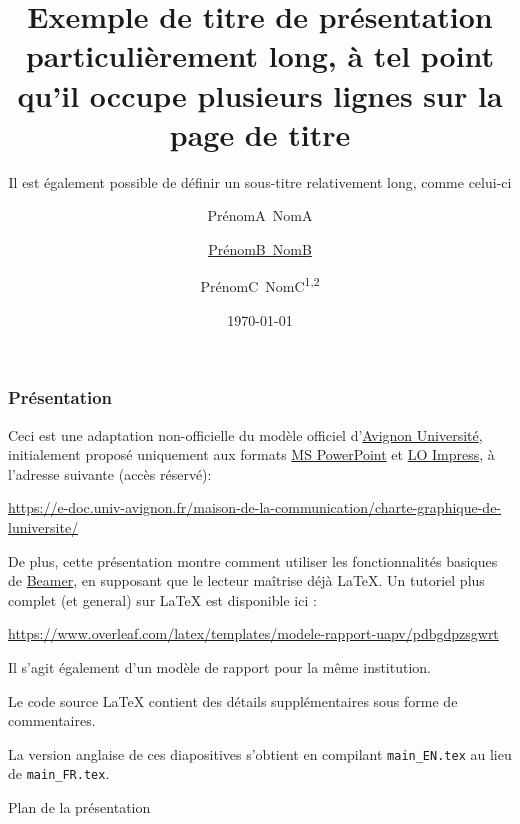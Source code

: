 \documentclass[10pt,    %
    french,             %
    xcolor=table,       %
    envcountsect,       %
    aspectratio=43      %
]{beamer}
\title[Titre court] %
    {Exemple de titre de présentation particulièrement long, à tel point qu'il occupe plusieurs lignes sur la page de titre}
\subtitle{Il est également possible de définir un sous-titre relativement long, comme celui-ci} %
\date[Date courte]  %
    {\today}        %
\author[Auteur court] %
{PrénomA~NomA\inst{1} \and \underline{PrénomB~NomB}\inst{2} \and PrénomC~NomC\textsuperscript{1,2}}
\institute[] %
{\inst{1} Laboratoire Informatique d'Avignon -- LIA EA 4128 \texttt{\{prénom.nom\}@univ-avignon.fr}
\and \inst{2} Institut d'Innovation Disruptive, Université de l'Excellence \texttt{\{prénom.nom\}@univ-excell.fr}
}
\begin{document}
\begin{frame}
  \titlepage
\end{frame}

\begin{frame}
    \label{frm:first}
    \frametitle{Présentation} 
    
    Ceci est une adaptation non-officielle du modèle officiel d'\href{http://univ-avignon.fr/}{Avignon Université}, initialement proposé uniquement aux formats \href{https://en.wikipedia.org/wiki/Microsoft\_PowerPoint}{MS PowerPoint} et \href{https://en.wikipedia.org/wiki/LibreOffice\#Included\_applications}{LO Impress}, à l'adresse  suivante (accès réservé):
    
    \url{https://e-doc.univ-avignon.fr/maison-de-la-communication/charte-graphique-de-luniversite/}
    
    \vspace{0.15cm}
    De plus, cette présentation montre comment utiliser les fonctionnalités basiques de \href{https://en.wikipedia.org/wiki/Beamer_(LaTeX)}{Beamer}, en supposant que le lecteur maîtrise déjà \LaTeX{}. Un tutoriel plus complet (et general) sur \LaTeX{} est disponible ici : 
    
    \url{https://www.overleaf.com/latex/templates/modele-rapport-uapv/pdbgdpzsgwrt}
    
    Il s'agit également d'un modèle de rapport pour la même institution.
    
    \vspace{0.15cm}
    Le code source \LaTeX{} contient des détails supplémentaires sous forme de commentaires.
    
    \vspace{0.15cm}
    La version anglaise de ces diapositives s'obtient en compilant \texttt{main\_EN.tex} au lieu de \texttt{main\_FR.tex}.
\end{frame}

\begin{frame}{Plan de la présentation}
    \tableofcontents
\end{frame}












\end{document}
